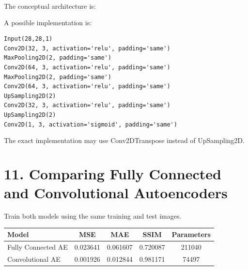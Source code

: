 \documentclass[10pt]{article}
\begin{document}
The conceptual architecture is:

\begin{center}
\end{center}

A possible implementation is:

\begin{verbatim}
Input(28,28,1)
Conv2D(32, 3, activation='relu', padding='same')
MaxPooling2D(2, padding='same')
Conv2D(64, 3, activation='relu', padding='same')
MaxPooling2D(2, padding='same')
Conv2D(64, 3, activation='relu', padding='same')
UpSampling2D(2)
Conv2D(32, 3, activation='relu', padding='same')
UpSampling2D(2)
Conv2D(1, 3, activation='sigmoid', padding='same')
\end{verbatim}

The exact implementation may use Conv2DTranspose instead of UpSampling2D.

\section*{11. Comparing Fully Connected and Convolutional Autoencoders}

Train both models using the same training and test images.

\begin{center}
\begin{tabular}{|l|c|c|c|c|}
\hline
Model & MSE & MAE & SSIM & Parameters \\
\hline
Fully Connected AE & 0.023641 & 0.061607 & 0.720087 & 211040 \\
Convolutional AE   & 0.001926 & 0.012844 & 0.981171 & 74497  \\
\hline
\end{tabular}
\end{center}
\end{document}
